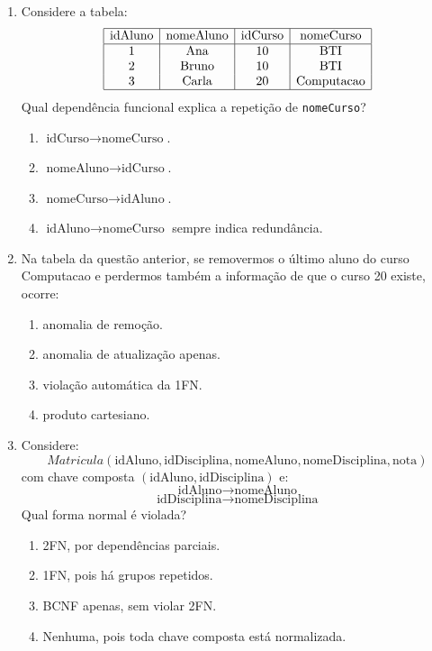 \documentclass[12pt,a4paper]{article}
\begin{document}
\begin{enumerate}[resume,label=\textbf{Q\arabic*.}]
\item Considere a tabela:
\[
\begin{array}{|c|c|c|c|}
\hline
\text{idAluno} & \text{nomeAluno} & \text{idCurso} & \text{nomeCurso}\\
\hline
1 & \text{Ana} & 10 & \text{BTI}\\
2 & \text{Bruno} & 10 & \text{BTI}\\
3 & \text{Carla} & 20 & \text{Computacao}\\
\hline
\end{array}
\]
Qual dependência funcional explica a repetição de \texttt{nomeCurso}?

\begin{enumerate}[label=\alph*)]
    \item $\text{idCurso} \rightarrow \text{nomeCurso}$.
    \item $\text{nomeAluno} \rightarrow \text{idCurso}$.
    \item $\text{nomeCurso} \rightarrow \text{idAluno}$.
    \item $\text{idAluno} \rightarrow \text{nomeCurso}$ sempre indica redundância.
\end{enumerate}

\item Na tabela da questão anterior, se removermos o último aluno do curso Computacao e perdermos também a informação de que o curso 20 existe, ocorre:

\begin{enumerate}[label=\alph*)]
    \item anomalia de remoção.
    \item anomalia de atualização apenas.
    \item violação automática da 1FN.
    \item produto cartesiano.
\end{enumerate}

\item Considere:
\[
Matricula(\text{idAluno}, \text{idDisciplina}, \text{nomeAluno}, \text{nomeDisciplina}, \text{nota})
\]
com chave composta $(\text{idAluno}, \text{idDisciplina})$ e:
\[
\text{idAluno} \rightarrow \text{nomeAluno}
\]
\[
\text{idDisciplina} \rightarrow \text{nomeDisciplina}
\]
Qual forma normal é violada?

\begin{enumerate}[label=\alph*)]
    \item 2FN, por dependências parciais.
    \item 1FN, pois há grupos repetidos.
    \item BCNF apenas, sem violar 2FN.
    \item Nenhuma, pois toda chave composta está normalizada.
\end{enumerate}


\end{enumerate}
\end{document}
